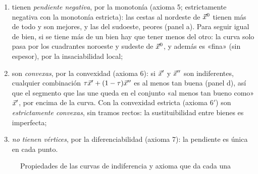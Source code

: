 \documentclass[11pt]{article}
\begin{document}
\begin{itemize}
\begin{enumerate}
  \item tienen \emph{pendiente negativa}, por la monotonía (axioma 5; estrictamente negativa con la monotonía estricta): las cestas al nordeste de $\vec{x}^0$ tienen más de todo y son mejores, y las del sudoeste, peores (panel a). Para seguir igual de bien, si se tiene más de un bien hay que tener menos del otro: la curva solo pasa por los cuadrantes noroeste y sudeste de $\vec{x}^0$, y además es «fina» (sin espesor), por la insaciabilidad local;
  \item son \emph{convexas}, por la convexidad (axioma 6): si $\vec{x}'$ y $\vec{x}''$ son indiferentes, cualquier combinación $\tau \vec{x}'+(1-\tau)\vec{x}''$ es al menos tan buena (panel d), así que el segmento que las une queda en el conjunto «al menos tan bueno como» $\vec{x}'$, por encima de la curva. Con la convexidad estricta (axioma 6$'$) son \emph{estrictamente convexas}, sin tramos rectos: la sustituibilidad entre bienes es imperfecta;
  \item \emph{no tienen vértices}, por la diferenciabilidad (axioma 7): la pendiente es única en cada punto.
  \end{enumerate}
\end{itemize}

\begin{figure}[H]
\centering
\caption{Propiedades de las curvas de indiferencia y axioma que da cada una}\label{fig:propiedades-curvas-indiferencia}
\end{figure}
\end{document}
